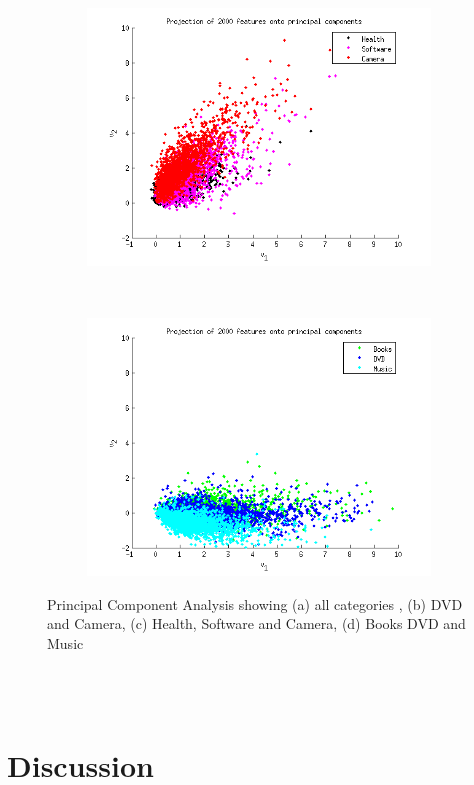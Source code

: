 \begin{figure}[h!btcp]
\begin{subfigure}[b]{0.5\textwidth}
                               \caption{}
        \end{subfigure}
	    \begin{subfigure}[b]{0.5\textwidth}
	            \centering
	            \includegraphics[width=\textwidth]{../Plottar/pca_largecorr.png}
	                           \caption{}
	    \end{subfigure}%
	    ~ %
	    \begin{subfigure}[b]{0.5\textwidth}
	            \centering
	            \includegraphics[width=\textwidth]{../Plottar/pca_somecorr.png} 
               \caption{}
	    \end{subfigure}
	    \caption{Principal Component Analysis showing (a) all categories , (b) DVD and Camera, (c) Health, Software and Camera, (d) Books DVD and Music}
                
\end{figure}
\\\\


\section{Discussion}

